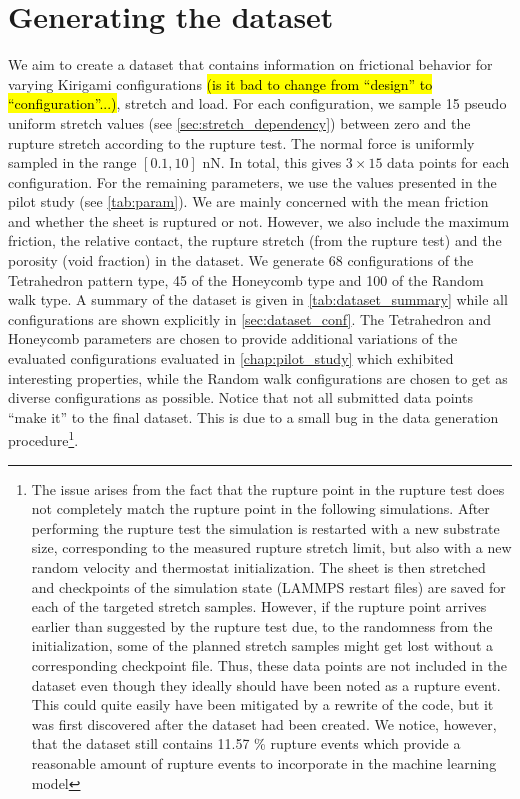 \section{Generating the dataset}
We aim to create a dataset that contains information on frictional behavior for
varying Kirigami configurations \hl{(is it bad to change from ``design'' to
``configuration''...)}, stretch and load. For each configuration, we sample 15
pseudo uniform stretch values (see \cref{sec:stretch_dependency}) between zero
and the rupture stretch according to the rupture test. The normal force is
uniformly sampled in the range $[0.1, 10]$ nN. In total, this gives $3\times 15$
data points for each configuration. For the remaining parameters, we use the
values presented in the pilot study (see \cref{tab:param}). We are mainly
concerned with the mean friction and whether the sheet is ruptured or not.
However, we also include the maximum friction, the relative contact, the rupture
stretch (from the rupture test) and the porosity (void fraction) in the dataset. We generate 68
configurations of the Tetrahedron pattern type, 45 of the Honeycomb type and 100
of the Random walk type. A summary of the dataset is given in
\cref{tab:dataset_summary} while all configurations are shown explicitly in
\cref{sec:dataset_conf}. The Tetrahedron and Honeycomb parameters are chosen to
provide additional variations of the evaluated configurations evaluated in
\cref{chap:pilot_study} which exhibited interesting properties, while the Random
walk configurations are chosen to get as diverse configurations as possible.
Notice that not all submitted data points ``make it'' to the final dataset. This
is due to a small bug in the data generation procedure\footnote{The issue arises from the fact that the rupture point in the rupture test does not
completely match the rupture point in the following simulations. After
performing the rupture test the simulation is restarted with a new substrate
size, corresponding to the measured rupture stretch limit, but also with a new
random velocity and thermostat initialization. The sheet is then stretched and
checkpoints of the simulation state (LAMMPS restart files) are saved for each of
the targeted stretch samples. However, if the rupture point arrives earlier than suggested by the rupture test due, to the randomness from the initialization, some of the planned stretch samples might get lost without a corresponding checkpoint file. Thus, these data points are not included in the dataset even though they ideally should have been noted as a rupture event. This could quite easily have been mitigated by a rewrite of the code, but it was first discovered after the dataset had been created. We notice, however, that the dataset still contains 11.57 \% rupture events which provide a reasonable amount of rupture events to incorporate in the machine learning model}.


